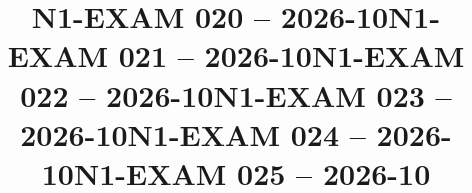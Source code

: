 \documentclass{ip-exam}
\begin{document}







\cleartoeven
\setcounter{questioncounter}{0}
\setcounter{page}{1}
\title{N1-EXAM 020 -- 2026-10}
\makeexamheader








\cleartoeven
\setcounter{questioncounter}{0}
\setcounter{page}{1}
\title{N1-EXAM 021 -- 2026-10}
\makeexamheader








\cleartoeven
\setcounter{questioncounter}{0}
\setcounter{page}{1}
\title{N1-EXAM 022 -- 2026-10}
\makeexamheader








\cleartoeven
\setcounter{questioncounter}{0}
\setcounter{page}{1}
\title{N1-EXAM 023 -- 2026-10}
\makeexamheader








\cleartoeven
\setcounter{questioncounter}{0}
\setcounter{page}{1}
\title{N1-EXAM 024 -- 2026-10}
\makeexamheader








\cleartoeven
\setcounter{questioncounter}{0}
\setcounter{page}{1}
\title{N1-EXAM 025 -- 2026-10}
\makeexamheader
\end{document}
